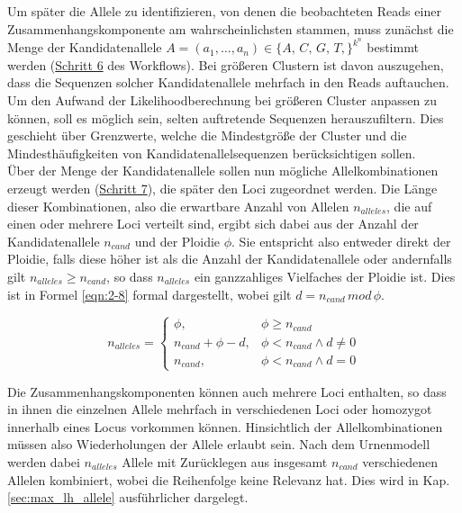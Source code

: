Um später die Allele zu identifizieren, von denen die beobachteten Reads einer Zusammenhangskomponente am wahrscheinlichsten stammen, muss zunächst die Menge der Kandidatenallele $A=(a_{1}, \dots, a_{n}) \in \{A,\,C,\,G,\,T,\}^{k^n}$ bestimmt werden (\hyperref[step6]{Schritt 6\label{step6txt}} des Workflows). Bei größeren Clustern ist davon auszugehen, dass die Sequenzen solcher Kandidatenallele mehrfach in den Reads auftauchen. Um den Aufwand der Likelihoodberechnung bei größeren Cluster anpassen zu können, soll es möglich sein, selten auftretende Sequenzen herauszufiltern. Dies geschieht über Grenzwerte, welche die Mindestgröße der Cluster und die Mindesthäufigkeiten von Kandidatenallelsequenzen berücksichtigen sollen. \\

Über der Menge der Kandidatenallele sollen nun mögliche Allelkombinationen erzeugt werden (\hyperref[step7]{Schritt 7\label{step7txt}}), die später den Loci zugeordnet werden. Die Länge dieser Kombinationen, also die erwartbare Anzahl von Allelen $n_{alleles}$, die auf einen oder mehrere Loci verteilt sind, ergibt sich dabei aus der Anzahl der Kandidatenallele $n_{cand}$ und der Ploidie $\phi$. Sie entspricht also entweder direkt der Ploidie, falls diese höher ist als die Anzahl der Kandidatenallele oder andernfalls gilt $n_{alleles} \geq n_{cand}$, so dass $n_{alleles}$ ein ganzzahliges Vielfaches der Ploidie ist. Dies ist in Formel \eqref{eqn:2-8} formal dargestellt, wobei gilt $d=n_{cand} \, mod \, \phi$.

\begin{equation} \label{eqn:2-8}
\tag{2-8}
n_{alleles} =
\left\{
\begin{array}{ll}
\phi, & \phi \geq n_{cand} \\
n_{cand} + \phi - d, & \phi < n_{cand} \wedge d \neq 0\\
n_{cand}, & \phi < n_{cand} \wedge d = 0
\end{array}
\right.
\end{equation}

Die Zusammenhangskomponenten können auch mehrere Loci enthalten, so dass in ihnen die einzelnen Allele mehrfach in verschiedenen Loci oder homozygot innerhalb eines Locus vorkommen können. Hinsichtlich der Allelkombinationen müssen also Wiederholungen der Allele erlaubt sein. Nach dem Urnenmodell werden dabei $n_{alleles}$ Allele mit Zurücklegen aus insgesamt $ n_{cand} $ verschiedenen Allelen kombiniert, wobei die Reihenfolge keine Relevanz hat. Dies wird in Kap. \ref{sec:max_lh_allele} ausführlicher dargelegt. \\

